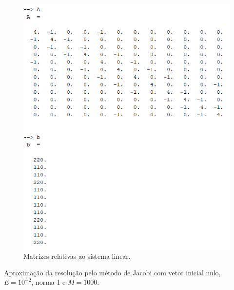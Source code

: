 \documentclass[11pt]{article}
\begin{document}
\begin{enumerate}
    \begin{figure}[H]
    \centering
    \includegraphics[]{6-b-matrices}
    \caption{Matrizes relativas ao sistema linear.}
    \end{figure}
    
    Aproximação da resolução pelo método de Jacobi com vetor inicial nulo, $E = 10^{-2}$, norma 1 e $M = 1000$:


\end{enumerate}
\end{document}
